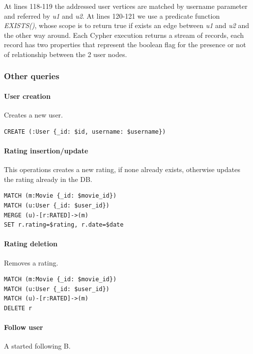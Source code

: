 \documentclass[11pt]{article}
\begin{document}


At lines 118-119 the addressed user vertices are matched by username parameter and referred by \emph{u1} and \emph{u2}.
At lines 120-121 we use a predicate function \emph{EXISTS()}, whose scope is to return true if exists an edge between \emph{u1} and \emph{u2} and the other way around.
Each Cypher execution returns a stream of records, each record has two properties that represent the boolean flag for the presence or not of relationship between the 2 user nodes.
\subsubsection{Other queries}

\paragraph{User creation} Creates a new user.

\begin{lstlisting}[language=Cypher]
CREATE (:User {_id: $id, username: $username})
\end{lstlisting}

\paragraph{Rating insertion/update} This operations creates a new rating, if none already exists, otherwise updates the rating already in the DB.

\begin{lstlisting}[language=Cypher]
MATCH (m:Movie {_id: $movie_id})
MATCH (u:User {_id: $user_id})
MERGE (u)-[r:RATED]->(m)
SET r.rating=$rating, r.date=$date
\end{lstlisting}

\paragraph{Rating deletion} Removes a rating.

\begin{lstlisting}[language=Cypher]
MATCH (m:Movie {_id: $movie_id})
MATCH (u:User {_id: $user_id})
MATCH (u)-[r:RATED]->(m)
DELETE r
\end{lstlisting}

\paragraph{Follow user} A started following B.
\end{document}
